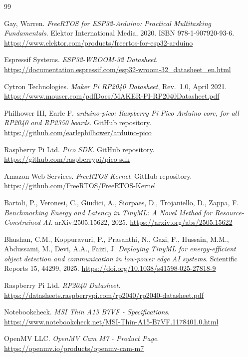 \documentclass[12pt,a4paper]{report}
\begin{document}
	
	\begin{thebibliography}{99}
		
		Gay, Warren. \textit{FreeRTOS for ESP32-Arduino: Practical Multitasking Fundamentals}. Elektor International Media, 2020. ISBN 978-1-907920-93-6.
		\url{https://www.elektor.com/products/freertos-for-esp32-arduino}
		
		Espressif Systems. \textit{ESP32-WROOM-32 Datasheet}.
		\url{https://documentation.espressif.com/esp32-wroom-32_datasheet_en.html}
		
		Cytron Technologies. \textit{Maker Pi RP2040 Datasheet}, Rev.~1.0, April 2021.
		\url{https://www.mouser.com/pdfDocs/MAKER-PI-RP2040Datasheet.pdf}
		
		Philhower III, Earle F. \textit{arduino-pico: Raspberry Pi Pico Arduino core, for all RP2040 and RP2350 boards}. GitHub repository.
		\url{https://github.com/earlephilhower/arduino-pico}
		
		Raspberry Pi Ltd. \textit{Pico SDK}. GitHub repository.
		\url{https://github.com/raspberrypi/pico-sdk}
		
		Amazon Web Services. \textit{FreeRTOS-Kernel}. GitHub repository.
		\url{https://github.com/FreeRTOS/FreeRTOS-Kernel}
		
		Bartoli, P., Veronesi, C., Giudici, A., Siorpaes, D., Trojaniello, D., Zappa, F. \textit{Benchmarking Energy and Latency in TinyML: A Novel Method for Resource-Constrained AI}. arXiv:2505.15622, 2025.
		\url{https://arxiv.org/abs/2505.15622}
		
		Bhushan, C.M., Koppuravuri, P., Prasanthi, N., Gazi, F., Hussain, M.M., Abdussami, M., Devi, A.A., Faizi, J. \textit{Deploying TinyML for energy-efficient object detection and communication in low-power edge AI systems}. Scientific Reports 15, 44299, 2025.
		\url{https://doi.org/10.1038/s41598-025-27818-9}
		
		Raspberry Pi Ltd. \textit{RP2040 Datasheet}.
		\url{https://datasheets.raspberrypi.com/rp2040/rp2040-datasheet.pdf}
		
		Notebookcheck. \textit{MSI Thin A15 B7VF - Specifications}.
		\url{https://www.notebookcheck.net/MSI-Thin-A15-B7VF.1178401.0.html}
		
		OpenMV LLC. \textit{OpenMV Cam M7 - Product Page}.
		\url{https://openmv.io/products/openmv-cam-m7}
		

\end{thebibliography}
\end{document}
